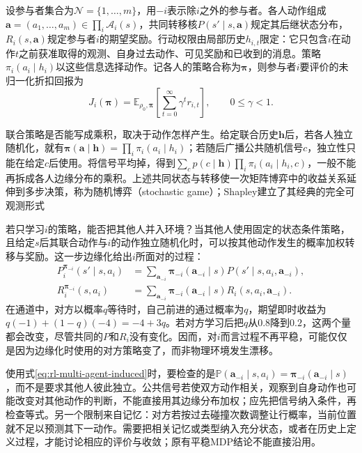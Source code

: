 \begin{definition}[多参与者序贯决策]
\label{def:rl-multi-agent-game}
设参与者集合为$\mathcal N=\{1,\ldots,m\}$，用$-i$表示除$i$之外的参与者。各人动作组成$\bm a=(a_1,\ldots,a_m)\in\prod_i\mathcal A_i(s)$，共同转移核$P(s'\mid s,\bm a)$规定其后继状态分布，$R_i(s,\bm a)$规定参与者$i$的期望奖励。行动权限由局部历史$h_{i,t}$限定：它只包含$i$在动作$t$之前获准取得的观测、自身过去动作、可见奖励和已收到的消息。策略$\pi_i(a_i\mid h_i)$以这些信息选择动作。记各人的策略合称为$\bm\pi$，则参与者$i$要评价的未归一化折扣回报为
\[
 J_i(\bm\pi)=\mathbb E_{\rho_0,\bm\pi}
 \left[\sum_{t=0}^{\infty}\gamma^t r_{i,t}\right],
 \qquad 0\leq\gamma<1.
\]
\end{definition}

联合策略是否能写成乘积，取决于动作怎样产生。给定联合历史$\bm h$后，若各人独立随机化，就有$\bm\pi(\bm a\mid\bm h)=\prod_i\pi_i(a_i\mid h_i)$；若随后广播公共随机信号$c$，独立性只能在给定$c$后使用。将信号平均掉，得到$\sum_c p(c\mid\bm h)\prod_i\pi_i(a_i\mid h_i,c)$，一般不能再拆成各人边缘分布的乘积。上述共同状态与转移使一次矩阵博弈中的收益关系延伸到多步决策，称为随机博弈（stochastic game）；Shapley建立了其经典的完全可观测形式

若只学习$i$的策略，能否把其他人并入环境？当其他人使用固定的状态条件策略，且给定$s$后其联合动作与$i$的动作独立随机化时，可以按其他动作发生的概率加权转移与奖励。这一步边缘化给出$i$所面对的过程：
\begin{align}
 P_i^{\bm\pi_{-i}}(s'\mid s,a_i)
 &=\sum_{\bm a_{-i}}\bm\pi_{-i}(\bm a_{-i}\mid s)
 P(s'\mid s,a_i,\bm a_{-i}),\label{eq:rl-multi-agent-induced}\\
 R_i^{\bm\pi_{-i}}(s,a_i)
 &=\sum_{\bm a_{-i}}\bm\pi_{-i}(\bm a_{-i}\mid s)
 R_i(s,a_i,\bm a_{-i}).\nonumber
\end{align}
在通道中，对方以概率$q$等待时，自己前进的通过概率为$q$，期望即时收益为$q(-1)+(1-q)(-4)=-4+3q$。若对方学习后把$q$从$0.8$降到$0.2$，这两个量都会改变，尽管共同的$P$和$R_i$没有变化。因而，对$i$而言过程不再平稳，可能仅仅是因为边缘化时使用的对方策略变了，而非物理环境发生漂移。

使用式\eqref{eq:rl-multi-agent-induced}时，要检查的是$\mathbb P(\bm a_{-i}\mid s,a_i)=\bm\pi_{-i}(\bm a_{-i}\mid s)$，而不是要求其他人彼此独立。公共信号若使双方动作相关，观察到自身动作也可能改变对其他动作的判断，不能直接用其边缘分布加权；应先把信号纳入条件，再检查等式。另一个限制来自记忆：对方若按过去碰撞次数调整让行概率，当前位置就不足以预测其下一动作。需要把相关记忆或类型纳入充分状态，或者在历史上定义过程，才能讨论相应的评价与收敛；原有平稳MDP结论不能直接沿用。

